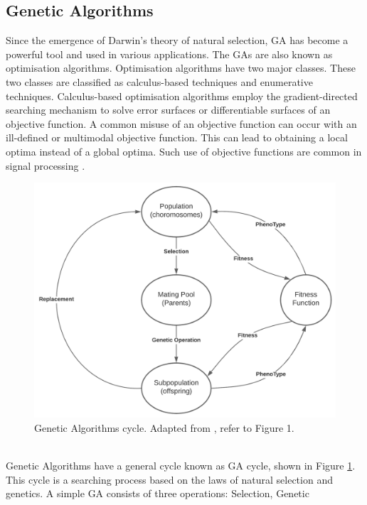 \documentclass[a4paper, 11pt]{article}
\begin{document}
    \subsection{Genetic Algorithms}\label{sec:bg_sub2}
    Since the emergence of Darwin's theory of natural selection, GA has become a powerful tool and used in various
    applications.  The GAs are also known as optimisation algorithms. Optimisation algorithms have two major classes.
    These two classes are classified as calculus-based techniques and enumerative techniques. Calculus-based
    optimisation algorithms employ the gradient-directed searching mechanism to solve error surfaces or differentiable
    surfaces of an objective function. A common misuse of an objective function can occur with an ill-defined or multimodal
    objective function. This can lead to obtaining a local optima instead of a global optima. Such use of objective
    functions are common in signal processing \cite{Tang1996}.
    \\
    \begin{figure}[h!]
        \centering
        \graphicspath{{./wiki/}}
        \includegraphics[scale=0.7]{GA_cycle.png}
        \caption{Genetic Algorithms cycle. Adapted from \cite{Tang1996}, refer to Figure 1.}
        \label{Fig:GA_cycle}
    \end{figure}
    \\
    Genetic Algorithms have a general cycle known as GA cycle, shown in Figure \ref{Fig:GA_cycle}. This cycle is a searching
    process  based on the laws of natural selection and genetics. A simple GA consists of three operations: Selection, Genetic
\end{document}
